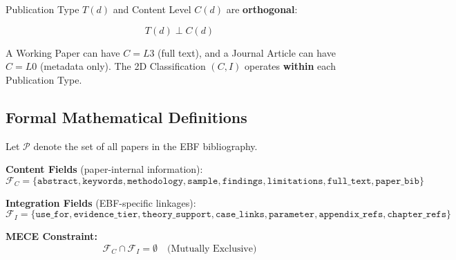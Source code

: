 \begin{tcolorbox}[colback=green!5!white, colframe=green!75!black,
    title=\textbf{Axiom PUB-2: Type-Content Independence}]

Publication Type $T(d)$ and Content Level $C(d)$ are \textbf{orthogonal}:

\begin{equation}
T(d) \perp C(d)
\end{equation}

A Working Paper can have $C = L3$ (full text), and a Journal Article can have $C = L0$ (metadata only).
The 2D Classification $(C, I)$ operates \textbf{within} each Publication Type.

\end{tcolorbox}


\subsection{Formal Mathematical Definitions}
\label{sec:paperint-formal}

Let $\mathcal{P}$ denote the set of all papers in the EBF bibliography.

\begin{tcolorbox}[colback=blue!5!white, colframe=blue!75!black,
    title=\textbf{Definition 1: Field Sets (Semantic Partition)}]

\textbf{Content Fields} (paper-internal information):
\begin{equation}
\mathcal{F}_C = \{\texttt{abstract}, \texttt{keywords}, \texttt{methodology}, \texttt{sample}, \texttt{findings}, \texttt{limitations}, \texttt{full\_text}, \texttt{paper\_bib}\}
\end{equation}

\textbf{Integration Fields} (EBF-specific linkages):
\begin{equation}
\mathcal{F}_I = \{\texttt{use\_for}, \texttt{evidence\_tier}, \texttt{theory\_support}, \texttt{case\_links}, \texttt{parameter}, \texttt{appendix\_refs}, \texttt{chapter\_refs}\}
\end{equation}

\textbf{MECE Constraint:}
\begin{equation}
\mathcal{F}_C \cap \mathcal{F}_I = \emptyset \quad \text{(Mutually Exclusive)}
\end{equation}

\end{tcolorbox}


